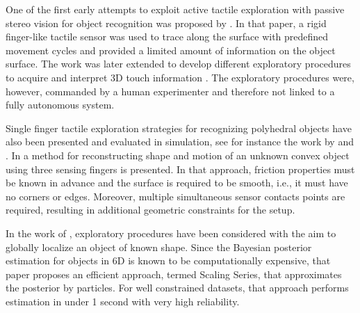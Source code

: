 
One of the first early attempts to exploit active tactile exploration with passive stereo vision for object recognition was proposed by \cite{Allen1987Robotic}. In that paper, a rigid finger-like tactile sensor was used to trace along the surface with predefined movement cycles and provided a limited amount of information on the object surface. The work was later extended to develop different exploratory procedures to acquire and interpret 3D touch information \cite{Allen1990Acquisition}. The exploratory procedures were, however, commanded by a human experimenter and therefore not linked to a fully autonomous system.

Single finger tactile exploration strategies for recognizing polyhedral objects have also been presented and evaluated in simulation, see for instance the work by \cite{Roberts1990ICRA} and \cite{Caselli1996ICRA}. In \cite{Moll2003STAR} a method for reconstructing shape and motion of an unknown convex object using three sensing fingers is presented. In that approach, friction properties must be known in advance and the surface is required to be smooth, i.e., it must have no corners or edges. Moreover, multiple simultaneous sensor contacts points are required, resulting in additional geometric constraints for the setup.


In the work of \cite{Petrovskaya2011Global}, exploratory procedures have been considered with the aim to globally localize an object of known shape. Since the Bayesian posterior estimation for objects in 6D is known to be computationally expensive, that paper proposes an efficient approach, termed Scaling Series, that approximates the posterior by particles. For well constrained datasets, that approach performs estimation in under 1 second with very high reliability.

